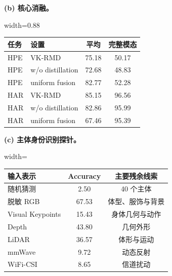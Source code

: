\documentclass[journal]{IEEEtran}
\begin{document}
\begin{table}[!t]
\vspace{0.5em}
\begin{minipage}[t]{0.48\textwidth}
\centering
\textbf{(b) 核心消融。}\par\smallskip
\begin{adjustbox}{width=0.88\linewidth}
\begin{tabular}{llcc}
\toprule
任务 & 设置 & 平均 & 完整模态 \\
\midrule
HPE & VK-RMD & 75.18 & 50.17 \\
HPE & w/o distillation & 72.68 & 48.83 \\
HPE & uniform fusion & 82.77 & 52.28 \\
HAR & VK-RMD & 85.15 & 96.56 \\
HAR & w/o distillation & 82.86 & 95.99 \\
HAR & uniform fusion & 67.46 & 95.39 \\
\bottomrule
\end{tabular}
\end{adjustbox}
\end{minipage}\hfill
\begin{minipage}[t]{0.48\textwidth}
\centering
\textbf{(c) 主体身份识别探针。}\par\smallskip
\begin{adjustbox}{width=\linewidth}
\begin{tabular}{lcc}
\toprule
输入表示 & Accuracy & 主要残余线索 \\
\midrule
随机猜测 & 2.50 & 40 个主体 \\
脱敏 RGB & 67.53 & 体型、服饰与背景 \\
Visual Keypoints & 15.43 & 身体几何与动作 \\
Depth & 43.80 & 几何外形 \\
LiDAR & 36.57 & 体形与运动 \\
mmWave & 9.72 & 动态反射 \\
WiFi-CSI & 8.65 & 信道扰动 \\
\bottomrule
\end{tabular}
\end{adjustbox}
\end{minipage}


\end{table}
\end{document}
